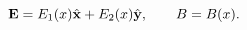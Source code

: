 \begin{equation}\label{2em}
{\bf E}=E_{1}(x)\hat{{\bf x}}+E_{2}(x)\hat{{\bf y}},\qquad
B=B(x).
\end{equation}

